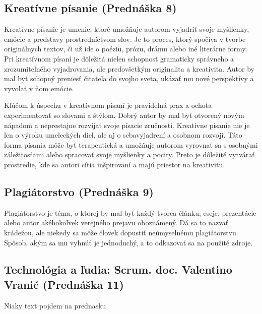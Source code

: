 \documentclass[12pt,twoside,slovak,a4paper]{article}
\begin{document}
\subsection{Kreatívne písanie (Prednáška 8)}

Kreatívne písanie je umenie, ktoré umožňuje autorom vyjadriť svoje myšlienky, emócie a predstavy prostredníctvom slov. Je to proces, ktorý spočíva v tvorbe originálnych textov, či už ide o poéziu, prózu, drámu alebo iné literárne formy. Pri kreatívnom písaní je dôležitá nielen schopnosť gramaticky správneho a zrozumiteľného vyjadrovania, ale predovšetkým originalita a kreativita. Autor by mal byť schopný preniesť čitateľa do svojho sveta, ukázať mu nové perspektívy a vyvolať v ňom emócie.

Kľúčom k úspechu v kreatívnom písaní je pravidelná prax a ochota experimentovať so slovami a štýlom. Dobrý autor by mal byť otvorený novým nápadom a neprestajne rozvíjať svoje písacie zručnosti. Kreatívne písanie nie je len o výroku umeleckých diel, ale aj o sebavyjadrení a osobnom rozvoji. Táto forma písania môže byť terapeutická a umožňuje autorom vyrovnať sa s osobnými záležitosťami alebo spracovať svoje myšlienky a pocity. Preto je dôležité vytvárať prostredie, kde sa autori cítia inšpirovaní a majú priestor na kreativitu.

\subsection{Plagiátorstvo (Prednáška 9)}
Plagiátorstvo je téma, o ktorej by mal byť každý tvorca článku, eseje, prezentácie alebo autor akéhokoľvek verejného prejavu oboznámený. Dá sa to nazvať krádežou, ale niekedy sa môže človek dopustiť neúmyselnému plagiátorstvu. Spôsob, akým sa mu vyhnúť je jednoduchý, a to odkazovať sa na použité zdroje.

\subsection{Technológia a ľudia: Scrum. doc. Valentino Vranić (Prednáška 11)}
Niaky text pojdem na prednasku




%
%
%






\end{document}
